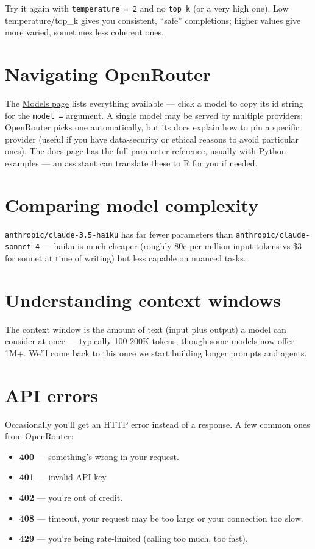 \documentclass[
  letterpaper,
  DIV=11,
  numbers=noendperiod]{scrreprt}
\providecommand{\tightlist}{%
  \setlength{\itemsep}{0pt}\setlength{\parskip}{0pt}}
\begin{document}
Try it again with \texttt{temperature\ =\ 2} and no \texttt{top\_k} (or
a very high one). Low temperature/top\_k gives you consistent, ``safe''
completions; higher values give more varied, sometimes less coherent
ones.

\section{Navigating OpenRouter}\label{navigating-openrouter}

The \href{https://openrouter.ai/models}{Models page} lists everything
available --- click a model to copy its id string for the
\texttt{model\ =} argument. A single model may be served by multiple
providers; OpenRouter picks one automatically, but its docs explain how
to pin a specific provider (useful if you have data-security or ethical
reasons to avoid particular ones). The
\href{https://openrouter.ai/docs/quickstart}{docs page} has the full
parameter reference, usually with Python examples --- an assistant can
translate these to R for you if needed.

\section{Comparing model complexity}\label{comparing-model-complexity}

\texttt{anthropic/claude-3.5-haiku} has far fewer parameters than
\texttt{anthropic/claude-sonnet-4} --- haiku is much cheaper (roughly
80c per million input tokens vs \$3 for sonnet at time of writing) but
less capable on nuanced tasks.

\section{Understanding context
windows}\label{understanding-context-windows}

The context window is the amount of text (input plus output) a model can
consider at once --- typically 100-200K tokens, though some models now
offer 1M+. We'll come back to this once we start building longer prompts
and agents.

\section{API errors}\label{api-errors}

Occasionally you'll get an HTTP error instead of a response. A few
common ones from OpenRouter:

\begin{itemize}
\tightlist
\item
  \textbf{400} --- something's wrong in your request.
\item
  \textbf{401} --- invalid API key.
\item
  \textbf{402} --- you're out of credit.
\item
  \textbf{408} --- timeout, your request may be too large or your
  connection too slow.
\item
  \textbf{429} --- you're being rate-limited (calling too much, too
  fast).
\end{itemize}
\end{document}
